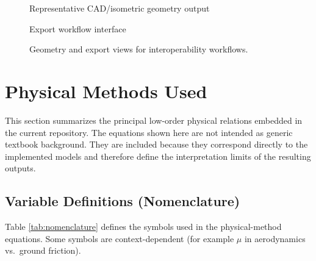 \begin{figure}[htbp]
\centering
\begin{minipage}[t]{0.48\textwidth}
\centering
{}

\small Representative CAD/isometric geometry output
\end{minipage}
\hfill
\begin{minipage}[t]{0.48\textwidth}
\centering
{}

\small Export workflow interface
\end{minipage}
\caption{Geometry and export views for interoperability workflows.}
\label{fig:export-interoperability-views}
\end{figure}

\section{Physical Methods Used}
This section summarizes the principal low-order physical relations embedded in the current repository. The equations shown here are not intended as generic textbook background. They are included because they correspond directly to the implemented models and therefore define the interpretation limits of the resulting outputs.

\subsection{Variable Definitions (Nomenclature)}
Table \ref{tab:nomenclature} defines the symbols used in the physical-method equations.
Some symbols are context-dependent (for example \(\mu\) in aerodynamics vs.\ ground friction).


